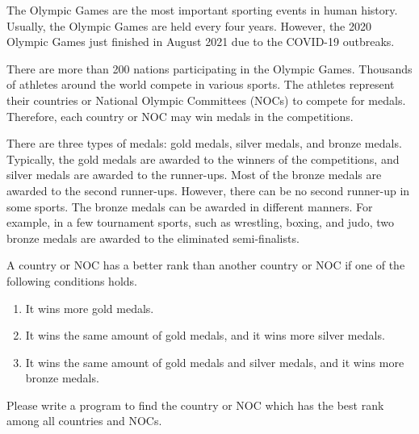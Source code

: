 The Olympic Games are the most important sporting events in human history.
Usually, the Olympic Games are held every four years.
However, the 2020 Olympic Games just finished in August 2021 due to
the COVID-19 outbreaks.

There are more than 200 nations participating in the Olympic Games. 
Thousands of athletes around the world compete in various sports. 
The athletes represent their countries or National Olympic Committees (NOCs)
to compete for medals. 
Therefore, each country or NOC may win medals in the competitions.

There are three types of medals: gold medals, silver medals, and bronze medals. 
Typically, the gold medals are awarded to the winners of the competitions,
and silver medals are awarded to the runner-ups.
Most of the bronze medals are awarded to the second runner-ups.
However, there can be no second runner-up in some sports.
The bronze medals can be awarded in different manners. 
For example, in a few tournament sports, such as wrestling, boxing, and judo,
two bronze medals are awarded to the eliminated semi-finalists. 

A country or NOC has a better rank than another country or NOC
if one of the following conditions holds.
\begin{enumerate}
\item It wins more gold medals.
\item It wins the same amount of gold medals, and it wins more silver medals.
\item It wins the same amount of gold medals and silver medals, 
and it wins more bronze medals.
\end{enumerate}

Please write a program to find the country or NOC which has the best rank
among all countries and NOCs.
